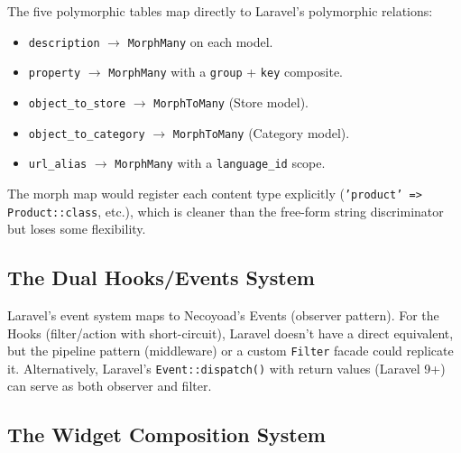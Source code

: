 \documentclass[11pt,a4paper]{article}
\begin{document}
\begin{reusebox}
The five polymorphic tables map directly to Laravel's polymorphic
relations:
\begin{itemize}[leftmargin=1.6em,itemsep=2pt]
  \item \texttt{description} $\to$ \texttt{MorphMany} on each model.
  \item \texttt{property} $\to$ \texttt{MorphMany} with a
        \texttt{group} + \texttt{key} composite.
  \item \texttt{object\_to\_store} $\to$ \texttt{MorphToMany}
        (Store model).
  \item \texttt{object\_to\_category} $\to$ \texttt{MorphToMany}
        (Category model).
  \item \texttt{url\_alias} $\to$ \texttt{MorphMany} with a
        \texttt{language\_id} scope.
\end{itemize}
The morph map would register each content type explicitly
(\texttt{'product' => Product::class}, etc.), which is cleaner than
the free-form string discriminator but loses some flexibility.
\end{reusebox}

\subsection{The Dual Hooks/Events System}

\begin{reusebox}
Laravel's event system maps to Necoyoad's Events (observer pattern).
For the Hooks (filter/action with short-circuit), Laravel doesn't
have a direct equivalent, but the pipeline pattern (middleware) or
a custom \texttt{Filter} facade could replicate it. Alternatively,
Laravel's \texttt{Event::dispatch()} with return values (Laravel 9+)
can serve as both observer and filter.
\end{reusebox}

\subsection{The Widget Composition System}
\end{document}
